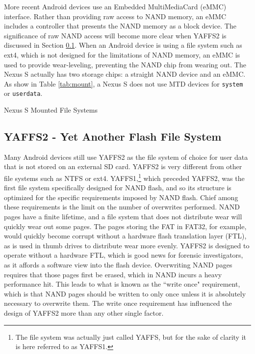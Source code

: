 More recent Android devices use an Embedded MultiMediaCard (eMMC) interface. Rather than providing raw access to NAND memory, an
eMMC includes a controller that presents the NAND memory as a block device. The significance of raw NAND access will become more
clear when YAFFS2 is discussed in Section \ref{sec:yaffs2}.  When an Android device is using a file system such as ext4, which is
not designed for the limitations of NAND memory, an eMMC is used to provide wear-leveling, preventing the NAND chip from wearing
out.  The Nexus S actually has two storage chips: a straight NAND device and an eMMC. As show in Table \ref{tab:mount}, a Nexus S
does not use MTD devices for \texttt{system} or \texttt{userdata}. 
\begin{table}[htb]
\lstset{numbers=none}

\caption{Nexus S Mounted File Systems}
\label{tab:mount}
\end{table}	

\subsection{YAFFS2 - Yet Another Flash File System} 
\label{sec:yaffs2}
Many Android devices still use YAFFS2 as the file system of choice for user data
that is not stored on an external SD card.  YAFFS2 is very different from other file systems such as NTFS or ext4.
YAFFS1,\footnote{The file system was actually just called YAFFS, but for the sake of clarity it is here referred to as YAFFS1.} which
preceded YAFFS2,  was the first file system specifically designed for NAND flash, and so its structure is optimized for the specific
requirements imposed by NAND flash.  Chief among these requirements is the limit on the number of overwrites performed.  NAND pages
have a finite lifetime, and a file system that does not distribute wear will quickly wear out some pages.  The pages storing the FAT
in FAT32, for example, would quickly become corrupt without a hardware flash translation layer (FTL), as is used in thumb drives to
distribute wear more evenly.  YAFFS2 is designed to operate without a hardware FTL, which is good news for forensic investigators,
as it affords a software view into the flash device.  Overwriting NAND pages requires that those pages first be erased, which in
NAND incurs a heavy performance hit.  This leads to what is known as the ``write once" requirement, which is that NAND pages should
be written to only once unless it is absolutely necessary to overwrite them. The write once requirement has influenced the design of
YAFFS2 more than any other single factor.

